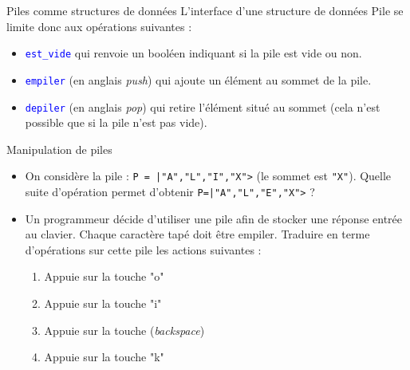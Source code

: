 \documentclass[10pt]{beamer}
\begin{document}
\begin{frame}{\Ctitle}{\stitle}
	\begin{alertblock}{Piles comme structures de données}
		L'interface d'une structure de données Pile se limite donc aux opérations suivantes :
		\begin{itemize}
			\item<2-> \textcolor{blue}{\tt est\_vide} qui renvoie un booléen indiquant si la pile est vide ou non.
			\item<3-> \textcolor{blue}{\tt empiler} (en anglais \textit{push}) qui ajoute un élément au sommet de la pile.
			\item<4-> \textcolor{blue}{\tt depiler} (en anglais \textit{pop}) qui retire l'élément situé au sommet (cela n'est possible que si la pile n'est pas vide).
		\end{itemize}
	\end{alertblock}
\end{frame}

\begin{frame}{\Ctitle}{\stitle}
	\begin{exampleblock}{Manipulation de piles}
		\begin{itemize}
			\item<2-> On considère la pile : {\tt P = |"A","L","I","X">} (le sommet est {\tt "X"}). Quelle suite d'opération permet d'obtenir {\tt P=|"A","L","E","X">} ?
			\item<3-> Un programmeur décide d'utiliser une pile afin de stocker une réponse entrée au clavier. Chaque caractère tapé doit être empiler. Traduire en terme d'opérations sur cette pile les actions suivantes :
				\begin{enumerate}
					\item<4-> Appuie sur la touche "o"
					\item<5-> Appuie sur la touche "i"
					\item<6-> Appuie sur la touche \framebox{$\longleftarrow$} (\textit{backspace})
					\item<7-> Appuie sur la touche "k"
				\end{enumerate}
		\end{itemize}
	\end{exampleblock}
\end{frame}
\end{document}
